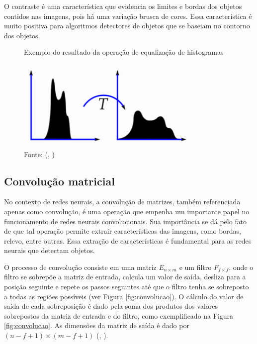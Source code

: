 \documentclass[]{politex}
\begin{document}
O contraste é uma característica que evidencia os limites e bordas dos objetos contidos nas imagens, pois há uma variação brusca de cores. Essa característica é muito positiva para algoritmos detectores de objetos que se baseiam no contorno dos objetos.

\begin{figure}[H]
    \centering
    \caption{Exemplo do resultado da operação de equalização de histogramas}
    \includegraphics[width=0.8\textwidth]{opencv_histograma}
    \caption*{Fonte: (, \citeyear{opencvtutorials})}
    \label{fig:opencv_histograma}
\end{figure}

\subsection{Convolução matricial}
No contexto de redes neurais, a convolução de matrizes, também referenciada apenas como convolução, é uma operação que empenha um importante papel no funcionamento de redes neurais convolucionais. Sua importância se dá pelo fato de que tal operação permite extrair características das imagens, como bordas, relevo, entre outras. Essa extração de características é fundamental para as redes neurais que detectam objetos.

O processo de convolução consiste em uma matriz \(E_{n \times m}\) e um filtro \(F_{f \times f}\), onde o filtro se sobrepõe a matriz de entrada, calcula um valor de saída, desliza para a posição seguinte e repete os passos seguintes até que o filtro tenha se sobreposto a todas as regiões possíveis (ver Figura \ref{fig:convolucao}). O cálculo do valor de saída de cada sobreposição é dado pela soma dos produtos dos valores sobrepostos da matriz de entrada e do filtro, como exemplificado na Figura \ref{fig:convolucao}. As dimensões da matriz de saída é dado por \( (n-f+1) \times (m-f+1)\) (, \citeyear{cnncourse}).
\end{document}
